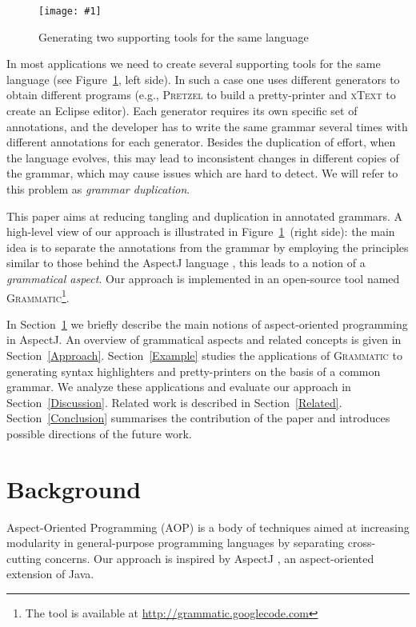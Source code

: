 \documentclass{IOS-Book-Article}     %
\newcommand{\fig}[2]{%
\begin{figure}%
\centering%
\texttt{[image: \#1]}%
\caption{#2}\label{#1}%
\end{figure}%
}
\newcommand{\figref}[1]{Figure~\ref{#1}}
\newcommand{\secref}[1]{Section~\ref{#1}}
\newcommand{\tool}[1]{\textsc{#1}}
\newcommand{\Grammatic}[0]{\tool{Grammatic}}
\begin{document}
\fig{problems_and_solution}{Generating two supporting tools for the same language}
In most applications we need to create several supporting tools for the same language (see \figref{problems_and_solution}, left side). 
In such a case one uses different generators to obtain different programs (e.g., \tool{Pretzel} \cite{Pretzel} to build a pretty-printer and \tool{xText} \cite{Xtext} to create an Eclipse editor). Each generator requires its own specific set of annotations, and the developer has to write the same grammar several times with different annotations for each generator. Besides the duplication of effort, when the language evolves, this may lead to inconsistent changes in different copies of the grammar, which may cause issues which are hard to detect. We will refer to this problem as \emph{grammar duplication}.

This paper aims at reducing tangling and duplication in annotated grammars. 
A high-level view of our approach is illustrated in \figref{problems_and_solution}~(right side): the main idea is to separate the annotations from the grammar by employing the principles similar to those behind the AspectJ language \cite{AspectJ}, this leads to a notion of a \emph{grammatical aspect}. Our approach is implemented in an open-source tool named \Grammatic{}\footnote{The tool is available at \url{http://grammatic.googlecode.com}}. 

In \secref{Background} we briefly describe the main notions of aspect-oriented programming in AspectJ. 
An overview of grammatical aspects and related concepts is given in \secref{Approach}. 
\secref{Example} studies the applications of \Grammatic{} to generating syntax highlighters and pretty-printers on the basis of a common grammar. We analyze these applications and evaluate our approach in \secref{Discussion}. Related work is described in \secref{Related}. \secref{Conclusion} summarises the contribution of the paper and introduces possible directions of the future work.

\section{Background}\label{Background}
Aspect-Oriented Programming (AOP) is a body of techniques aimed at increasing modularity in general-purpose programming languages by separating cross-cutting concerns. Our approach is inspired by AspectJ \cite{AspectJ}, an aspect-oriented extension of Java. 
\end{document}
